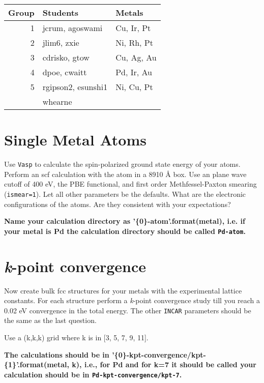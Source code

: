 \documentclass[11pt]{article}
\begin{document}
\begin{center}
\begin{tabular}{rll}
Group & Students & Metals\\
\hline
1 & jcrum, agoswami & Cu, Ir, Pt\\
2 & jlim6,  zxie & Ni, Rh, Pt\\
3 & cdrisko, gtow & Cu, Ag, Au\\
4 & dpoe, cwaitt & Pd, Ir, Au\\
5 & rgipson2, esunshi1 & Ni, Cu, Pt\\
 & whearne & \\
\end{tabular}
\end{center}


\section{Single Metal Atoms}
\label{sec:org6d5c1c6}

Use \texttt{Vasp} to calculate the spin-polarized ground state energy of your atoms. Perform an scf calculation with the atom in a 8\texttimes{}9\texttimes{}10 \AA{} box. Use an plane wave cutoff of 400 eV, the PBE functional, and first order Methfessel-Paxton smearing (\texttt{ismear=1}). Let all other parameters be the defaults. What are the electronic configurations of the atoms. Are they consistent with your expectations?

\textbf{Name your calculation directory as '\{0\}-atom'.format(metal), i.e. if your metal is Pd the calculation directory should be called \texttt{Pd-atom}.}

\section{\emph{k}-point convergence}
\label{sec:orgce5a574}

Now create bulk fcc structures for your metals with the experimental lattice constants. For each structure perform a \emph{k}-point convergence study till you reach a 0.02 eV convergence in the total energy. The other \texttt{INCAR} parameters should be the same as the last question.

Use a (k,k,k) grid where k is in [3, 5, 7, 9, 11].

\textbf{The calculations should be in '\{0\}-kpt-convergence/kpt-\{1\}'.format(metal, k), i.e., for Pd and for k=7 it should be called your calculation should be in \texttt{Pd-kpt-convergence/kpt-7}.} 
\end{document}
